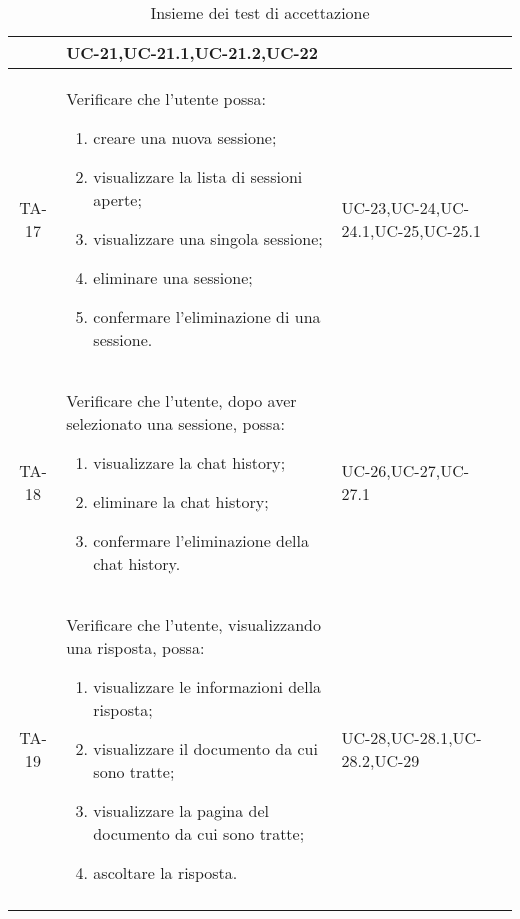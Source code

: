 \begin{xltabular}{\textwidth}{| c | X | X | c |}
\begin{enumerate}
    \end{enumerate}& UC-21,\newline UC-21.1,\newline UC-21.2,\newline UC-22 & \textcolor{xmarkcolor}{} \\
    \hline
     TA-17 & Verificare che l’utente possa:
    \begin{enumerate}
        \item creare una nuova sessione;
        \item visualizzare la lista di sessioni aperte;
        \item visualizzare una singola sessione;
        \item eliminare una sessione;
        \item confermare l'eliminazione di una sessione.
        
        
    \end{enumerate}& UC-23,\newline UC-24,\newline UC-24.1,\newline UC-25,\newline UC-25.1 & \textcolor{xmarkcolor}{} \\
    \hline
    TA-18 & Verificare che l'utente, dopo aver selezionato una sessione, possa:
    \begin{enumerate}
        \item visualizzare la chat history;
        \item eliminare la chat history;
        \item confermare l'eliminazione della chat history.
        
    \end{enumerate}& UC-26,\newline UC-27,\newline UC-27.1 & \textcolor{xmarkcolor}{}  \\
    \hline
    
     TA-19 & Verificare che l'utente, visualizzando una risposta, possa:
    \begin{enumerate}
        \item visualizzare le informazioni della risposta;
        \item visualizzare il documento da cui sono tratte;
        \item visualizzare la pagina del documento da cui sono tratte;
        \item ascoltare la risposta.
        
    \end{enumerate}& UC-28,\newline UC-28.1,\newline UC-28.2,\newline UC-29 & \textcolor{xmarkcolor}{} \\
    \hline

     \caption{Insieme dei test di accettazione} 
    
\end{xltabular}
\endgroup

